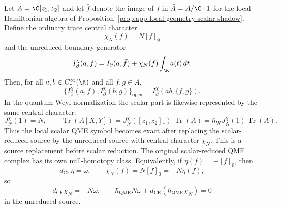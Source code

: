 \begin{thm}
\label{thm:app-central-character-qme-cancellation}
  Let \(A=\C[z_1,z_2]\) and let
  \(\bar f\) denote the image of \(f\) in
  \(\bar A=A/\C\cdot1\) for the local Hamiltonian algebra of
  Proposition~\ref{prop:app-local-geometry-scalar-shadow}.  Define the
  ordinary trace central character
  \[
    \chi_N(f)=N[f]_0
  \]
  and the unreduced boundary generator
  \[
    I^\chi_\partial(a,f)
      =I_\partial(a,\bar f)+\chi_N(f)\int_\R a(t)\,dt .
  \]
  Then, for all \(a,b\in C_c^\infty(\R)\) and all
  \(f,g\in A\),
  \[
    \{I^\chi_\partial(a,f),I^\chi_\partial(b,g)\}_{\mathrm{open}}
      =
    I^\chi_\partial(ab,\{f,g\}).
  \]
  In the quantum Weyl normalization the scalar part is likewise
  represented by the same central character:
  \[
    J^\chi_N(1)=N,\qquad
    \operatorname{Tr}(A[X,Y])
      =J^\chi_N([z_1,z_2]_{*})\,\operatorname{Tr}(A)
      =\hbar_{\mathrm{W}} J^\chi_N(1)\operatorname{Tr}(A).
  \]
  Thus the local scalar QME symbol becomes exact after replacing the
  scalar-reduced source by the unreduced source with central character
  \(\chi_N\).  This is a source replacement before scalar reduction.  The
  original scalar-reduced QME complex has its own null-homotopy class.
  Equivalently, if \(\eta(f)=-[f]_0\), then
  \[
    d_{\mathrm{CE}}\eta=\omega,\qquad
    \chi_N(f)=N[f]_0=-N\eta(f),
  \]
  so
  \[
    d_{\mathrm{CE}}\chi_N=-N\omega,\qquad
    \hbar_{\mathrm{QME}}N\omega
      +d_{\mathrm{CE}}(\hbar_{\mathrm{QME}}\chi_N)=0
  \]
  in the unreduced source.
\end{thm}


